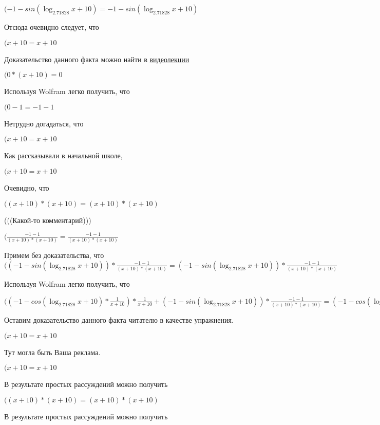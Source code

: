 \documentclass[12pt,a4paper,fleqn]{article}
\theoremstyle{definition}
\begin{document}
$( -1  - sin(\log_{ 2.71828 }{ x  +  10 }) =  -1  - sin(\log_{ 2.71828 }{ x  +  10 })$

Отсюда очевидно следует, что

$( x  +  10  =  x  +  10 $

Доказательство данного факта можно найти в \href{https://www.youtube.com/watch?v=dQw4w9WgXcQ}{видеолекции}

$( 0  * ( x  +  10 ) =  0 $

Используя Wolfram легко получить, что

$( 0  -  1  =  -1  -  1 $

Нетрудно догадаться, что

$( x  +  10  =  x  +  10 $

Как рассказывали в начальной школе,

$( x  +  10  =  x  +  10 $

Очевидно, что

$(( x  +  10 ) * ( x  +  10 ) = ( x  +  10 ) * ( x  +  10 )$

(((Какой-то комментарий)))

$(\frac{ -1  -  1 }{( x  +  10 ) * ( x  +  10 )}
 = \frac{ -1  -  1 }{( x  +  10 ) * ( x  +  10 )}
$

Примем без доказательства, что
$(( -1  - sin(\log_{ 2.71828 }{ x  +  10 })) * \frac{ -1  -  1 }{( x  +  10 ) * ( x  +  10 )}
 = ( -1  - sin(\log_{ 2.71828 }{ x  +  10 })) * \frac{ -1  -  1 }{( x  +  10 ) * ( x  +  10 )}
$

Используя Wolfram легко получить, что

$(( -1  - cos(\log_{ 2.71828 }{ x  +  10 }) * \frac{ 1 }{ x  +  10 }
) * \frac{ 1 }{ x  +  10 }
 + ( -1  - sin(\log_{ 2.71828 }{ x  +  10 })) * \frac{ -1  -  1 }{( x  +  10 ) * ( x  +  10 )}
 = ( -1  - cos(\log_{ 2.71828 }{ x  +  10 }) * \frac{ 1 }{ x  +  10 }
) * \frac{ 1 }{ x  +  10 }
 + ( -1  - sin(\log_{ 2.71828 }{ x  +  10 })) * \frac{ -1  -  1 }{( x  +  10 ) * ( x  +  10 )}
$

Оставим доказательство данного факта читателю в качестве упражнения.

$( x  +  10  =  x  +  10 $

Тут могла быть Ваша реклама.

$( x  +  10  =  x  +  10 $

В результате простых рассуждений можно получить

$(( x  +  10 ) * ( x  +  10 ) = ( x  +  10 ) * ( x  +  10 )$

В результате простых рассуждений можно получить
\end{document}
